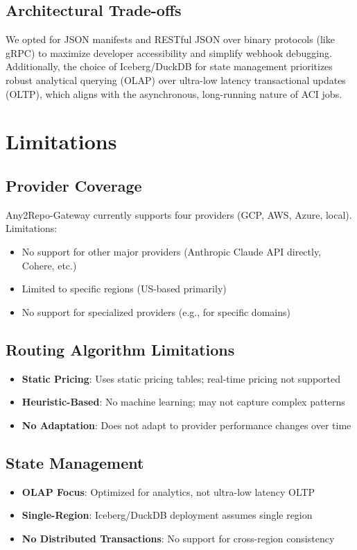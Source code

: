\documentclass[10pt]{article}
\begin{document}
\subsection{Architectural Trade-offs}

We opted for JSON manifests and RESTful JSON over binary protocols (like gRPC) to maximize developer accessibility and simplify webhook debugging. Additionally, the choice of Iceberg/DuckDB for state management prioritizes robust analytical querying (OLAP) over ultra-low latency transactional updates (OLTP), which aligns with the asynchronous, long-running nature of ACI jobs.

\section{Limitations}

\subsection{Provider Coverage}
Any2Repo-Gateway currently supports four providers (GCP, AWS, Azure, local). Limitations:
\begin{itemize}
    \item No support for other major providers (Anthropic Claude API directly, Cohere, etc.)
    \item Limited to specific regions (US-based primarily)
    \item No support for specialized providers (e.g., for specific domains)
\end{itemize}

\subsection{Routing Algorithm Limitations}
\begin{itemize}
    \item \textbf{Static Pricing}: Uses static pricing tables; real-time pricing not supported
    \item \textbf{Heuristic-Based}: No machine learning; may not capture complex patterns
    \item \textbf{No Adaptation}: Does not adapt to provider performance changes over time
\end{itemize}

\subsection{State Management}
\begin{itemize}
    \item \textbf{OLAP Focus}: Optimized for analytics, not ultra-low latency OLTP
    \item \textbf{Single-Region}: Iceberg/DuckDB deployment assumes single region
    \item \textbf{No Distributed Transactions}: No support for cross-region consistency
\end{itemize}
\end{document}
